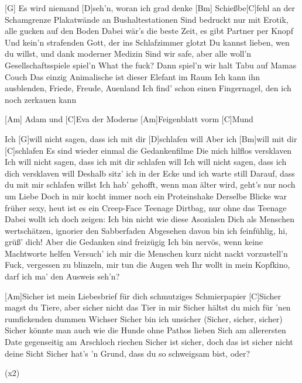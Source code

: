 

\begin{guitar}
	[G] Es wird niemand [D]seh'n, woran ich grad denke
	[Bm] Schießbe[C]fehl an der Schamgrenze
	Plakatwände an Bushaltestationen
	Sind bedruckt nur mit Erotik, alle gucken auf den Boden
	Dabei wär's die beste Zeit, es gibt Partner per Knopf
	Und kein'n strafenden Gott, der ins Schlafzimmer glotzt
	Du kannst lieben, wen du willst, und dank moderner Medizin
	Sind wir safe, aber alle woll'n Gesellschaftsspiele spiel'n
	What the fuck? Dann spiel'n wir halt Tabu auf Mamas Couch
	Das einzig Animalische ist dieser Elefant im Raum
	Ich kann ihn ausblenden, Friede, Freude, Auenland
	Ich find' schon einen Fingernagel, den ich noch zerkauen kann
	
	[Am] Adam und [C]Eva der Moderne
	[Am]Feigenblatt vorm [C]Mund
	
	Ich [G]will nicht sagen, dass ich mit dir [D]schlafen will
	Aber ich [Bm]will mit dir [C]schlafen
	Es sind wieder einmal die Gedankenfilme
	Die mich hilflos versklaven
	Ich will nicht sagen, dass ich mit dir schlafen will
	Ich will nicht sagen, dass ich dich versklaven will
	Deshalb sitz' ich in der Ecke und ich warte still
	Darauf, dass du mit mir schlafen willst
	\pagebreak
	Ich hab' gehofft, wenn man älter wird, geht's nur noch um Liebe
	Doch in mir kocht immer noch ein Proteinshake
	Derselbe Blicke war früher sexy, heut ist es ein Creep-Face
	Teenage Dirtbag, nur ohne das Teenage
	Dabei wollt ich doch zeigen: Ich bin nicht wie diese Asozialen
	Dich als Menschen wertschätzen, ignorier den Sabberfaden
	Abgesehen davon bin ich feinfühlig, hi, grüß' dich!
	Aber die Gedanken sind freizügig
	Ich bin nervös, wenn keine Machtworte helfen
	Versuch' ich mir die Menschen kurz nicht nackt vorzustell'n
	Fuck, vergessen zu blinzeln, mir tun die Augen weh
	Ihr wollt in mein Kopfkino, darf ich ma' den Ausweis seh'n?
	
	 
	
	 
	
	[Am]Sicher ist mein Liebesbrief für dich schmutziges Schmierpapier
	[C]Sicher magst du Tiere, aber sicher nicht das Tier in mir
	Sicher hältst du mich für 'nen rumfickenden dummen Wichser
	Sicher bin ich unsicher (Sicher, sicher, sicher)
	Sicher könnte man auch wie die Hunde ohne Pathos lieben
	Sich am allerersten Date gegenseitig am Arschloch riechen
	Sicher ist sicher, doch das ist sicher nicht deine Sicht
	Sicher hat's 'n Grund, dass du so schweigsam bist, oder?
	
	  (x2)
\end{guitar}